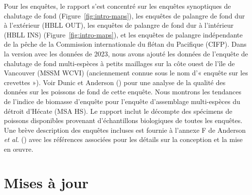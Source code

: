 \documentclass[12pt]{article}\usepackage[]{graphicx}\usepackage[]{color}
\begin{document}
Pour les enquêtes, le rapport s'est concentré sur les enquêtes synoptiques de chalutage de fond (Figure~\ref{fig:intro-maps}), les enquêtes de palangre de fond dur à l'extérieur (HBLL OUT), les enquêtes de palangre de fond dur à l'intérieur (HBLL INS) (Figure~\ref{fig:intro-maps}), et les enquêtes de palangre indépendante de la pêche de la Commission internationale du flétan du Pacifique (CIFP). Dans la version avec les données de 2023, nous avons ajouté les données de l'enquête de chalutage de fond multi-espèces à petits maillages sur la côte ouest de l'île de Vancouver (MSSM WCVI) (anciennement connue sous le nom d'« enquête sur les crevettes »). Voir Dunic et Anderson () pour une analyse de la qualité des données sur les poissons de fond de cette enquête. Nous montrons les tendances de l'indice de biomasse d'enquête pour l'enquête d'assemblage multi-espèces du détroit d'Hécate (MSA HS). Le rapport inclut le décompte des spécimens de poissons disponibles provenant d'échantillons biologiques de toutes les enquêtes. Une brève description des enquêtes incluses est fournie à l'annexe F de Anderson \emph{et al.} () avec les références associées pour les détails sur la conception et la mise en œuvre.



\section{Mises à jour}\label{sec:update}
\end{document}
